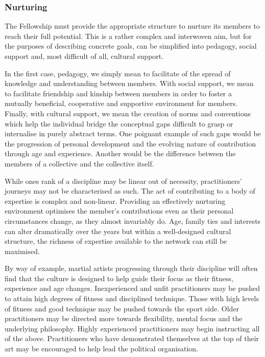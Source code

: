 \documentclass[9pt,oneside]{amsart}
\begin{document}
\subsubsection{Nurturing}

The Fellowship must provide the appropriate structure to nurture its members to reach their full potential. This is a rather complex and interwoven aim, but for the purposes of describing concrete goals, can be simplified into pedagogy, social support and, most difficult of all, cultural support.

In the first case, pedagogy, we simply mean to facilitate of the spread of knowledge and understanding between members. With social support, we mean to facilitate friendship and kinship between members in order to foster a mutually beneficial, cooperative and supportive environment for members. Finally, with cultural support, we mean the creation of norms and conventions which help the individual bridge the conceptual gaps difficult to grasp or internalise in purely abstract terms. One poignant example of such gaps would be the progression of personal development and the evolving nature of contribution through age and experience. Another would be the difference between the members of a collective and the collective itself.

While ones rank of a discipline may be linear out of necessity, practitioners' journeys may not be  characterised as such. The act of contributing to a body of expertise is complex and non-linear. Providing an effectively nurturing environment optimises the member's contributions even as their personal circumstances change, as they almost invariably do. Age, family ties and interests can alter dramatically over the years but within a well-designed cultural structure, the richness of expertise available to the network can still be maximised.

By way of example, martial artists progressing through their discipline will often find that the culture is designed to help guide their focus as their fitness, experience and age changes. Inexperienced and unfit practitioners may be pushed to attain high degrees of fitness and disciplined technique. Those with high levels of fitness and good technique may be pushed towards the sport side. Older practitioners may be directed more towards flexibility, mental focus and the underlying philosophy. Highly experienced practitioners may begin instructing all of the above. Practitioners who have demonstrated themselves at the top of their art may be encouraged to help lead the political organisation.
\end{document}
